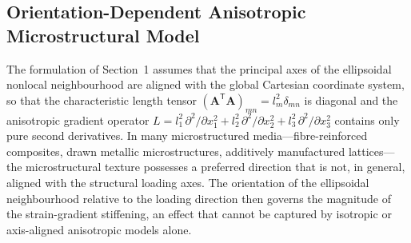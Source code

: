 \documentclass[final,3p,times,fleqn]{elsarticle}
\begin{document}

\subsection{Orientation-Dependent Anisotropic Microstructural Model}
\label{sec:3D_orientation_model}

The formulation of Section~1 assumes that the
principal axes of the ellipsoidal nonlocal neighbourhood are aligned
with the global Cartesian coordinate system, so that the characteristic
length tensor $(\mathbf{A}^{\mathsf{T}}\mathbf{A})_{mn} = l_{m}^{2}
\delta_{mn}$ is diagonal and the anisotropic gradient operator
$L = l_{1}^{2}\,\partial^{2}/\partial x_{1}^{2}
 + l_{2}^{2}\,\partial^{2}/\partial x_{2}^{2}
 + l_{3}^{2}\,\partial^{2}/\partial x_{3}^{2}$
contains only pure second derivatives.
In many microstructured media---fibre-reinforced composites, drawn
metallic microstructures, additively manufactured lattices---the
microstructural texture possesses a preferred direction that is not,
in general, aligned with the structural loading axes.
The orientation of the ellipsoidal neighbourhood relative to the
loading direction then governs the magnitude of the strain-gradient
stiffening, an effect that cannot be captured by isotropic or
axis-aligned anisotropic models alone.
\end{document}
